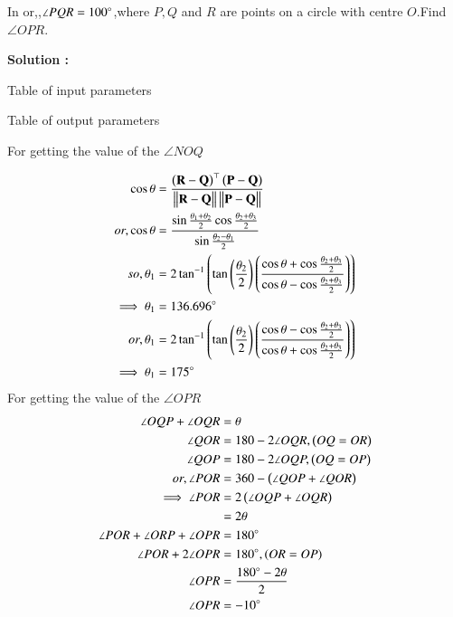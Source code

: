 In  or,,$\angle PQR = 100\degree$,where $P,Q$ and $R$ are points on a circle with centre $O$.Find $\angle OPR$.

\textbf{Solution :}
\begin{table}[H]
    \centering
    
    \caption{Table of input parameters}
    \label{tab:tab:1}
\end{table}

\begin{table}[H]
    \centering
    
    \caption{Table of output parameters}
    \label{tab:tab:2}
\end{table}

For getting the value of the $\angle NOQ$

\begin{align}
    \cos{\theta}&=\frac{\left(\mathbf{R-Q}\right)^{\top}\left(\mathbf{P-Q}\right)}{\mathbf{\left\Vert R-Q\right\Vert\left\Vert P-Q\right\Vert}}\\
    or,\cos{\theta}&=\frac{\sin{\frac{\theta_1+\theta_2}{2}}\cos{\frac{\theta_2+\theta_3}{2}}}{\sin{\frac{\theta_2-\theta_1}{2}}}\\
    so,\theta_1&=2\tan^{-1}\left(\tan\left({\frac{\theta_2}{2}}\right)\left(\frac{\cos{\theta}+\cos{\frac{\theta_2+\theta_3}{2}}}{\cos{\theta}-\cos{\frac{\theta_2+\theta_3}{2}}}\right)\right)\\
    \implies \theta_1&=136.696\degree\\
    or,\theta_1&=2\tan^{-1}\left(\tan\left({\frac{\theta_2}{2}}\right)\left(\frac{\cos{\theta}-\cos{\frac{\theta_2+\theta_3}{2}}}{\cos{\theta}+\cos{\frac{\theta_2+\theta_3}{2}}}\right)\right)\\
    \implies \theta_1&=175\degree\\
\end{align}
For getting the value of the $\angle OPR$
\begin{align}
    \angle OQP +\angle OQR &=\theta\\
    \angle QOR &=180-2\angle OQR,\left(OQ=OR\right)\\
        \angle QOP &=180-2\angle OQP,\left(OQ=OP\right)\\
        or,\angle POR &= 360-\left(\angle QOP+\angle QOR\right)\\
        \implies \angle POR &= 2\left(\angle OQP +\angle OQR\right)\\
        &=2\theta\\
    \angle POR +\angle ORP +\angle OPR &= 180\degree\\
    \angle POR +2\angle OPR&= 180\degree, \left(OR=OP\right)\\
\angle OPR &= \frac{180\degree-2\theta}{2}\\
 \angle OPR &=-10\degree
 \end{align}


